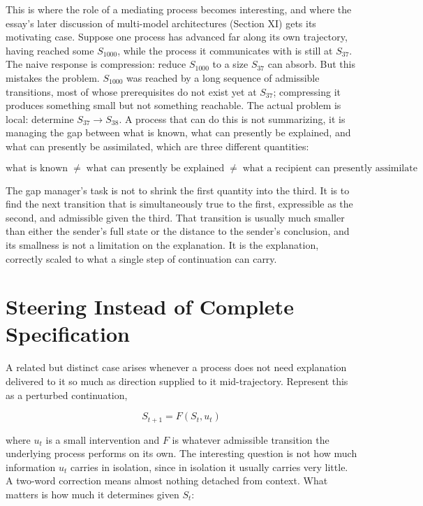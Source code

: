 \documentclass[11pt]{article}
\begin{document}
This is where the role of a mediating process becomes interesting, and where the essay's later discussion of multi-model architectures (Section XI) gets its motivating case. Suppose one process has advanced far along its own trajectory, having reached some $S_{1000}$, while the process it communicates with is still at $S_{37}$. The naive response is compression: reduce $S_{1000}$ to a size $S_{37}$ can absorb. But this mistakes the problem. $S_{1000}$ was reached by a long sequence of admissible transitions, most of whose prerequisites do not exist yet at $S_{37}$; compressing it produces something small but not something reachable. The actual problem is local: determine $S_{37} \rightarrow S_{38}$. A process that can do this is not summarizing, it is managing the gap between what is known, what can presently be explained, and what can presently be assimilated, which are three different quantities:

\[
\text{what is known} \;\neq\; \text{what can presently be explained} \;\neq\; \text{what a recipient can presently assimilate}
\]

The gap manager's task is not to shrink the first quantity into the third. It is to find the next transition that is simultaneously true to the first, expressible as the second, and admissible given the third. That transition is usually much smaller than either the sender's full state or the distance to the sender's conclusion, and its smallness is not a limitation on the explanation. It is the explanation, correctly scaled to what a single step of continuation can carry.

\section{Steering Instead of Complete Specification}

A related but distinct case arises whenever a process does not need explanation delivered to it so much as direction supplied to it mid-trajectory. Represent this as a perturbed continuation,

\[
S_{t+1} = F(S_t, u_t)
\]

where $u_t$ is a small intervention and $F$ is whatever admissible transition the underlying process performs on its own. The interesting question is not how much information $u_t$ carries in isolation, since in isolation it usually carries very little. A two-word correction means almost nothing detached from context. What matters is how much it determines given $S_t$:
\end{document}
